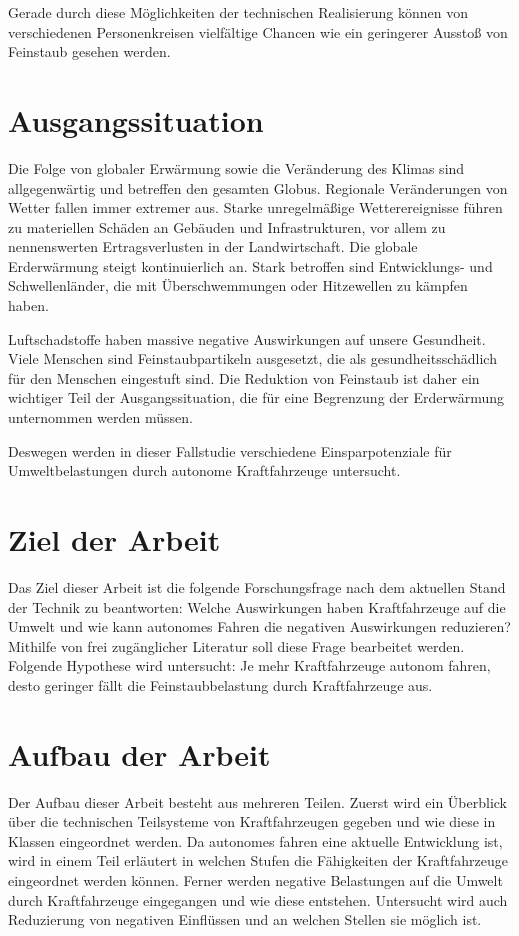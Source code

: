 Gerade durch diese Möglichkeiten der technischen Realisierung können von verschiedenen Personenkreisen
vielfältige Chancen wie ein geringerer Ausstoß von Feinstaub gesehen werden.

\section{Ausgangssituation}
Die Folge von globaler Erwärmung sowie die Veränderung des Klimas sind allgegenwärtig und betreffen den gesamten Globus.
Regionale Veränderungen von Wetter fallen immer extremer aus.
Starke unregelmäßige Wetterereignisse führen zu materiellen Schäden an Gebäuden und Infrastrukturen, vor allem zu nennenswerten Ertragsverlusten in der Landwirtschaft.
Die globale Erderwärmung steigt kontinuierlich an.
Stark betroffen sind Entwicklungs- und Schwellenländer, die mit Überschwemmungen oder Hitzewellen zu kämpfen haben.


Luftschadstoffe haben massive negative Auswirkungen auf unsere Gesundheit.
Viele Menschen sind Feinstaubpartikeln ausgesetzt, die als gesundheitsschädlich für den Menschen eingestuft sind.
Die Reduktion von Feinstaub ist daher ein wichtiger Teil der Ausgangssituation, die für eine Begrenzung der Erderwärmung unternommen werden müssen.

Deswegen werden in dieser Fallstudie verschiedene Einsparpotenziale für Umweltbelastungen durch autonome Kraftfahrzeuge untersucht.


\section{Ziel der Arbeit}
Das Ziel dieser Arbeit ist die folgende Forschungsfrage nach dem aktuellen Stand der Technik zu beantworten:
Welche Auswirkungen haben Kraftfahrzeuge auf die Umwelt und wie kann autonomes Fahren die negativen Auswirkungen reduzieren?
Mithilfe von frei zugänglicher Literatur soll diese Frage bearbeitet werden.
Folgende Hypothese wird untersucht:
Je mehr Kraftfahrzeuge autonom fahren, desto geringer fällt die Feinstaubbelastung durch Kraftfahrzeuge aus.

\section{Aufbau der Arbeit}
Der Aufbau dieser Arbeit besteht aus mehreren Teilen.
Zuerst wird ein Überblick über die technischen Teilsysteme von Kraftfahrzeugen gegeben und wie diese
in Klassen eingeordnet werden.
Da autonomes fahren eine aktuelle Entwicklung ist, wird in einem Teil erläutert in welchen Stufen die Fähigkeiten der Kraftfahrzeuge eingeordnet werden können.
Ferner werden negative Belastungen auf die Umwelt durch Kraftfahrzeuge eingegangen und wie diese entstehen.
Untersucht wird auch Reduzierung von negativen Einflüssen und an welchen Stellen sie möglich ist.

\newpage